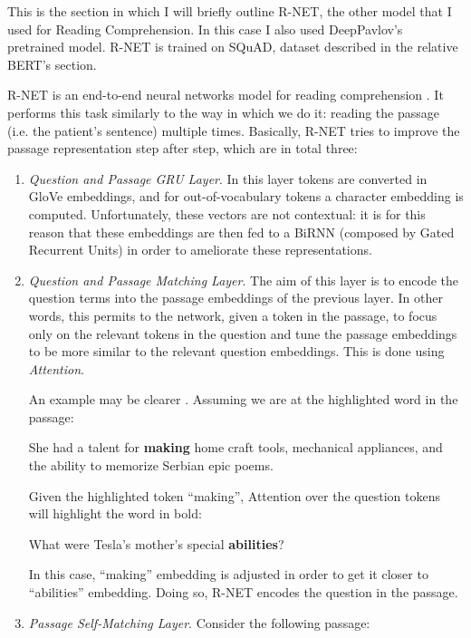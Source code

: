 This is the section in which I will briefly outline R-NET, the other model that I used for Reading Comprehension. In this case I also used DeepPavlov's pretrained model. R-NET is trained on SQuAD, dataset described in the relative BERT's section.

R-NET is an end-to-end neural networks model for reading comprehension \cite{rnet}. It performs this task similarly to the way in which we do it: reading the passage (i.e. the patient's sentence) multiple times. Basically, R-NET tries to improve the passage representation step after step, which are in total three:
\begin{enumerate}
  \item \textit{Question and Passage GRU Layer}. In this layer tokens are converted in GloVe embeddings, and for out-of-vocabulary tokens a character embedding is computed. Unfortunately, these vectors are not contextual: it is for this reason that these embeddings are then fed to a BiRNN (composed by Gated Recurrent Units) in order to ameliorate these representations.
  \item \textit{Question and Passage Matching Layer}. The aim of this layer is to encode the question terms into the passage embeddings of the previous layer. In other words, this permits to the network, given a token in the passage, to focus only on the relevant tokens in the question and tune the passage embeddings to be more similar to the relevant question embeddings. This is done using \textit{Attention}.
  
An example may be clearer \cite{understandingrnet}. Assuming we are at the highlighted word in the passage:

\begin{displayquote}
She had a talent for \textbf{making} home craft tools, mechanical appliances, and the ability to memorize Serbian epic poems.
\end{displayquote}

Given the highlighted token ``making'', Attention over the question tokens will highlight the word in bold:

\begin{displayquote}
What were Tesla's mother's special \textbf{abilities}?
\end{displayquote}

In this case, ``making'' embedding is adjusted in order to get it closer to ``abilities'' embedding. Doing so, R-NET encodes the question in the passage.

  \item \textit{Passage Self-Matching Layer}. Consider the following passage:
  

\end{enumerate}
